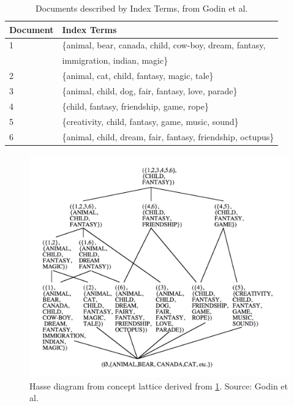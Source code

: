 \documentclass[11pt]{report}
\begin{document}
\begin{table}[h]
\caption{Documents described by Index Terms, from Godin et al. \cite{Godin1993}}
\label{table:fcair}
\centering

\def\arraystretch{1.2}%
\begin{tabular}{ | l | l | }
\hline
 Document & Index Terms \\
\hline

1 & \{animal, bear, canada, child, cow-boy, dream, fantasy,\\
  & immigration, indian, magic\} \\
2 & \{animal, cat, child, fantasy, magic, tale\} \\
3 & \{animal, child, dog, fair, fantasy, love, parade\} \\
4 & \{child, fantasy, friendship, game, rope\} \\
5 & \{creativity, child, fantasy, game, music, sound\} \\
6 & \{animal, child, dream, fair, fantasy, friendship, octupus\} \\

\hline
\end{tabular}
\end{table}

\begin{figure}[!ht]
	\centering
	\includegraphics[width=\linewidth]{./images/fcair}
\caption{Hasse diagram from concept lattice derived from \ref{table:fcair}. Source: Godin et al. \cite{Godin1993}}
\label{figure:fcair}
\end{figure}
\end{document}

